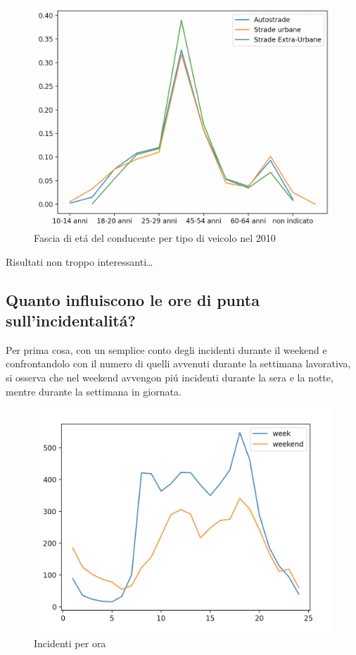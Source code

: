 \documentclass[a4paper]{report}
\begin{document}
\begin{figure}[!ht]
    \includegraphics[width=\linewidth]{../src/incidenti/incidenti_senza_coords/tipo_veicoli/differenza_eta.png}
    \caption{Fascia di et\'a del conducente per tipo di veicolo nel 2010}
    \label{fig:differenza_eta}
\end{figure}

Risultati non troppo interessanti\dots



\newpage
\subsection{Quanto influiscono le ore di punta sull'incidentalit\'a?}

Per prima cosa, con un semplice conto degli incidenti durante il weekend 
e confrontandolo con il numero di quelli avvenuti durante la 
settimana lavorativa, si osserva che nel weekend avvengon pi\'u incidenti 
durante la sera e la notte, mentre durante la settimana in giornata.

\begin{figure}[!ht]
    \includegraphics[width=\linewidth]{../src/incidenti/incidenti_senza_coords/ore_punta/week_weekend.png}
    \caption{Incidenti per ora}
    \label{fig:week_weekend}
\end{figure}
\end{document}
